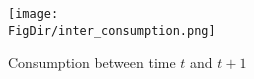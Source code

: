 \begin{figure}[ht]
  \centerline{
    \texttt{[image: \\FigDir/inter\_consumption.png]}
  }
  \caption{Consumption between time $t$ and $t+1$} \label{fig:inter_consumption}
\end{figure}
